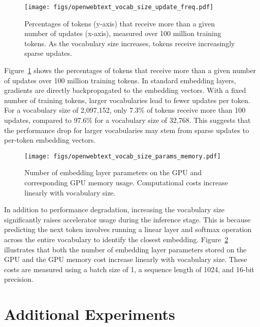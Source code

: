 \begin{figure}[h]
    \centering
    \texttt{[image: figs/openwebtext\_vocab\_size\_update\_freq.pdf]}
    \caption{Percentages of tokens (y-axis) that receive more than a given number of updates (x-axis), measured over 100 million training tokens. As the vocabulary size increases, tokens receive increasingly sparse updates.}
    \label{fig:update_freq_vary_vocab}
\end{figure}


Figure~\ref{fig:update_freq_vary_vocab} shows the percentages  of tokens that receive more than a given number of updates over 100 million training tokens. In standard embedding layers, gradients are directly backpropagated to the embedding vectors. With a fixed number of training tokens, larger vocabularies lead to fewer updates per token. For a vocabulary size of 2,097,152, only 7.3\% of tokens receive more than 100 updates, compared to 97.6\% for a vocabulary size of 32,768. This suggests that the performance drop for larger vocabularies may stem from sparse updates to per-token embedding vectors.

\begin{figure}[h]
    \centering
    \texttt{[image: figs/openwebtext\_vocab\_size\_params\_memory.pdf]}
    \caption{Number of embedding layer parameters on the GPU and corresponding GPU memory usage. Computational costs increase linearly with vocabulary size.}
    \label{fig:gpu_cost_vary_vocab}
\end{figure}



In addition to performance degradation, increasing the vocabulary size significantly raises accelerator usage during the inference stage. This is because predicting the next token involves running a linear layer and softmax operation across the entire vocabulary to identify the closest embedding. Figure~\ref{fig:gpu_cost_vary_vocab} illustrates that both the number of embedding layer parameters stored on the GPU and the GPU memory cost increase linearly with vocabulary size. These costs are measured using a batch size of 1, a sequence length of 1024, and 16-bit precision. 







\section{Additional Experiments}
\label{sec:addition_results}


